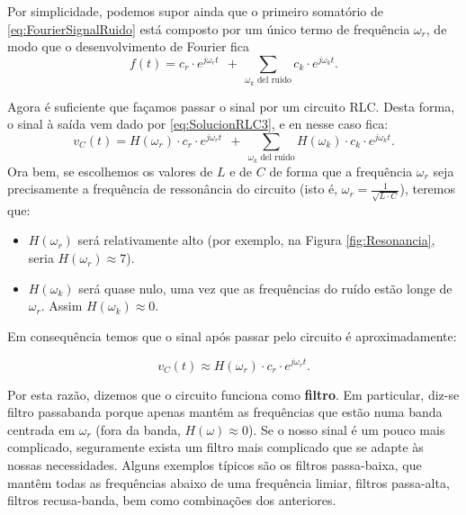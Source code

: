 Por simplicidade, podemos supor ainda que o primeiro somatório de \eqref{eq:FourierSignalRuido} está composto por um único termo de frequência $\omega_r$, de modo que o desenvolvimento de Fourier fica
\begin{equation}
  \label{eq:FourierSignalRuido}
  f(t) = c_r \cdot e^{j\omega_r t}\ \ +\  \sum_{\omega_k\text{ del ruido}}\!\!\!\!\!c_k \cdot e^{j\omega_k t}.
\end{equation}

Agora é suficiente que façamos passar o sinal por um circuito RLC. Desta forma, o sinal à saída vem dado por \eqref{eq:SolucionRLC3}, e en nesse caso fica:
\begin{equation}
  \label{eq:FourierSignalFiltrada1}
  v_C(t) = H(\omega_r) \cdot c_r \cdot e^{j\omega_r t}\ \ +\  \sum_{\omega_k\text{ del ruido}}\!\!\!\!\! H(\omega_k)\cdot c_k\cdot e^{j\omega_k t}.
\end{equation}
 Ora bem, se escolhemos os valores de $L$ e de $C$ de forma que a frequência $\omega_r$ seja precisamente a frequência de ressonância do circuito (isto é, $\omega_r = \frac{1}{\sqrt{L\cdot C}}$), teremos que:
 \begin{itemize}
 \item $H(\omega_r)$ será relativamente alto (por exemplo, na Figura \ref{fig:Resonancia}, seria $H(\omega_r)\approx 7$).
 \item $H(\omega_k)$ será quase nulo, uma vez que as frequências do ruído estão longe de $\omega_r$. Assim  $H(\omega_k)\approx 0$.
 \end{itemize}
Em consequência temos que o sinal após passar pelo circuito é aproximadamente:
\begin{mybox}\vspace{-15pt}
  \begin{equation}
    \label{eq:FourierSignalFiltrada}
    v_C(t) \approx H(\omega_r) \cdot c_r \cdot e^{j\omega_r t}.
  \end{equation}
\end{mybox}

Por esta razão, dizemos que o circuito funciona como \textbf{filtro}. Em particular, diz-se filtro passabanda porque apenas mantém as frequências que estão numa banda centrada em $\omega_r$ (fora da banda, $H(\omega)\approx 0$). Se o nosso sinal é um pouco mais complicado, seguramente exista um filtro mais complicado que se adapte às nossas necessidades. Alguns exemplos típicos são os filtros passa-baixa, que mantêm todas as frequências abaixo de uma frequência limiar, filtros passa-alta, filtros recusa-banda, bem como combinações dos anteriores.





\newpage



